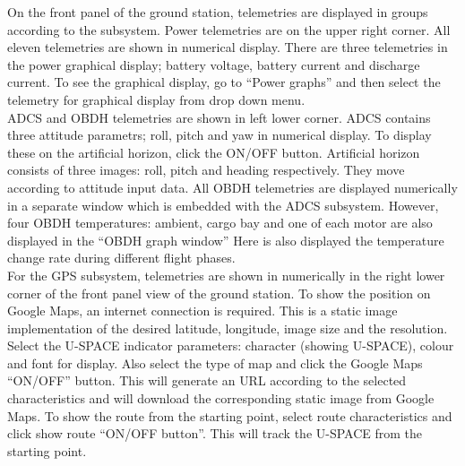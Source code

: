%
On the front panel of the ground station, telemetries are displayed in groups according to the subsystem. Power telemetries are on the upper right corner. All eleven telemetries are shown in numerical display. There are three telemetries in the power graphical display; battery voltage, battery current and discharge current. To see the graphical display, go to ``Power graphs'' and then select the telemetry for graphical display from drop down menu.\\ 
\ac{ADCS} and \ac{OBDH} telemetries are shown in left lower corner. \ac{ADCS} contains three attitude parametrs; roll, pitch and yaw in numerical display. To display these on the artificial horizon, click the ON/OFF button. Artificial horizon consists of three images: roll, pitch and heading respectively. They move according to attitude input data. All \ac{OBDH} telemetries are displayed numerically in a separate window which is embedded with the \ac{ADCS} subsystem. However, four \ac{OBDH} temperatures: ambient, cargo bay and one of each motor are also displayed in the ``\ac{OBDH} graph window'' Here is also displayed the temperature change rate during different flight phases.\\
%
\noindent
For the GPS subsystem, telemetries are shown in numerically in the right lower corner of the front panel view of the ground station. To show the position on Google Maps, an internet connection is required. This is a static image implementation of the desired latitude, longitude, image size and the resolution. Select the \ac{U-SPACE} indicator parameters: character (showing \ac{U-SPACE}), colour and font for display. Also select the type of map and click the Google Maps ``ON/OFF'' button. This will generate an \ac{URL} according to the selected characteristics and will download the corresponding static image from Google Maps. To show the route from the starting point, select route characteristics and click show route ``ON/OFF button''. This will track the \ac{U-SPACE} from the starting point.